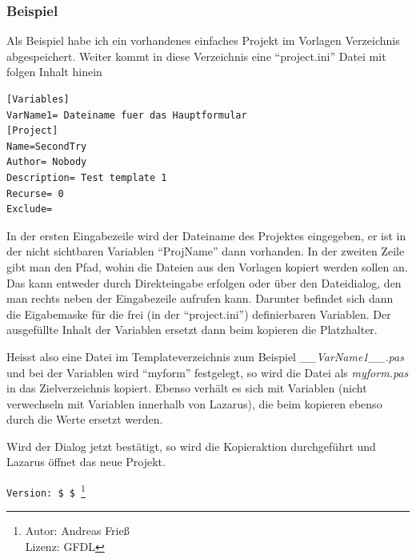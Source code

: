 \subsubsection{Beispiel}
Als Beispiel habe ich ein vorhandenes einfaches Projekt im Vorlagen Verzeichnis abgespeichert. Weiter kommt in diese Verzeichnis eine "`project.ini"' Datei mit folgen Inhalt hinein
\begin{verbatim}
[Variables]
VarName1= Dateiname fuer das Hauptformular
[Project]
Name=SecondTry
Author= Nobody
Description= Test template 1
Recurse= 0
Exclude=
\end{verbatim}
\label{fig:ProjectTempl05}
In der ersten Eingabezeile wird der Dateiname des Projektes eingegeben, er ist in der nicht sichtbaren Variablen "`ProjName"' dann vorhanden. In der zweiten Zeile gibt man den Pfad, wohin die Dateien aus den Vorlagen kopiert werden sollen an. Das kann entweder durch Direkteingabe erfolgen oder über den Dateidialog, den man rechts neben der Eingabezeile aufrufen kann. Darunter befindet sich dann die Eigabemaske für die frei (in der "`project.ini"') definierbaren Variablen. Der ausgefüllte Inhalt der Variablen ersetzt dann beim kopieren die Platzhalter.

Heisst also eine Datei im Templateverzeichnis zum Beispiel \textit{\_\_VarName1\_\_.pas} und bei der Variablen wird "`myform"' festgelegt, so wird die Datei als \textit{myform.pas} in das Zielverzeichnis kopiert. Ebenso verhält es sich mit Variablen (nicht verwechseln mit Variablen innerhalb von Lazarus), die beim kopieren ebenso durch die Werte ersetzt werden. 

Wird der Dialog jetzt bestätigt, so wird die Kopieraktion durchgeführt und Lazarus öffnet das neue Projekt.

\verb|Version: $ $ |\footnote{ Autor: Andreas Frieß\\Lizenz: GFDL}